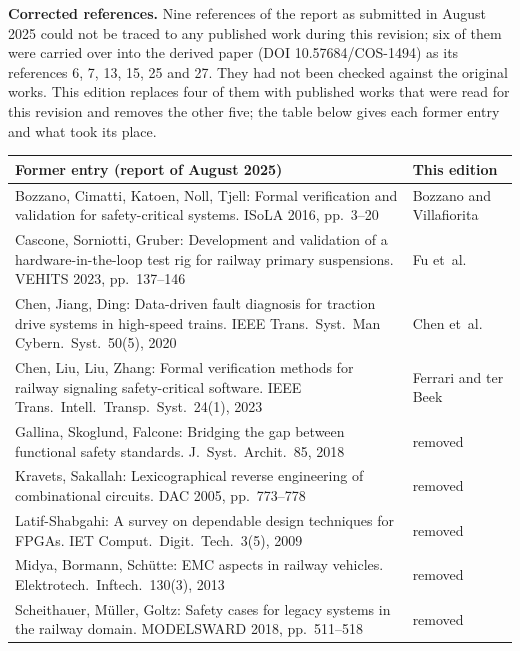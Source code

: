 \documentclass[12pt,ngerman,english,openany]{book}
\begin{document}
{	\textbf{Corrected references.} Nine references of the report as submitted in August 2025 could not be traced to any published work during this revision; six of them were carried over into the derived paper (DOI 10.57684/COS-1494) as its references 6, 7, 13, 15, 25 and 27. They had not been checked against the original works. This edition replaces four of them with published works that were read for this revision and removes the other five; the table below gives each former entry and what took its place.

	{\footnotesize
	\begin{tabular}{@{}p{}>{\raggedright\arraybackslash}p{}@{}}
		\toprule
		Former entry (report of August 2025) & This edition \\
		\midrule
		Bozzano, Cimatti, Katoen, Noll, Tjell: Formal verification and validation for safety-critical systems. ISoLA 2016, pp.~3--20 & Bozzano and Villafiorita~\cite{bozzano2016formal} \\
		Cascone, Sorniotti, Gruber: Development and validation of a hardware-in-the-loop test rig for railway primary suspensions. VEHITS 2023, pp.~137--146 & Fu et~al.~\cite{hil_rail_suspension_2023} \\
		Chen, Jiang, Ding: Data-driven fault diagnosis for traction drive systems in high-speed trains. IEEE Trans.\ Syst.\ Man Cybern.\ Syst.\ 50(5), 2020 & Chen et~al.~\cite{chen2020diagnostics} \\
		Chen, Liu, Liu, Zhang: Formal verification methods for railway signaling safety-critical software. IEEE Trans.\ Intell.\ Transp.\ Syst.\ 24(1), 2023 & Ferrari and ter Beek~\cite{formal_verification_rail_2023} \\
		Gallina, Skoglund, Falcone: Bridging the gap between functional safety standards. J.\ Syst.\ Archit.\ 85, 2018 & removed \\
		Kravets, Sakallah: Lexicographical reverse engineering of combinational circuits. DAC 2005, pp.~773--778 & removed \\
		Latif-Shabgahi: A survey on dependable design techniques for FPGAs. IET Comput.\ Digit.\ Tech.\ 3(5), 2009 & removed \\
		Midya, Bormann, Schütte: EMC aspects in railway vehicles. Elektrotech.\ Inftech.\ 130(3), 2013 & removed \\
		Scheithauer, Müller, Goltz: Safety cases for legacy systems in the railway domain. MODELSWARD 2018, pp.~511--518 & removed \\
		\bottomrule
	\end{tabular}
	}
}
\clearpage
\end{document}
